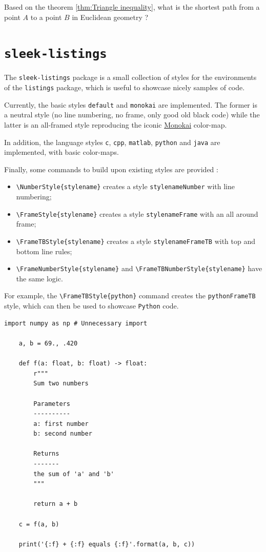 \documentclass[a4paper, 12pt]{report}
\def\tbs{\textbackslash}
\begin{document}
    \begin{fmd-question*}
        Based on the theorem \ref{thm:Triangle inequality}, what is the shortest path from a point $A$ to a point $B$ in Euclidean geometry ?
    \end{fmd-question*}

    \newpage

    \section{\texttt{sleek-listings}}

    The \texttt{sleek-listings} package is a small collection of styles for the environments of the \texttt{listings} package, which is useful to showcase nicely samples of code.

    Currently, the basic styles \texttt{default} and \texttt{monokai} are implemented. The former is a neutral style (no line numbering, no frame, only good old black code) while the latter is an all-framed style reproducing the iconic \href{https://monokai.nl/}{Monokai} color-map.

    In addition, the language styles \texttt{c}, \texttt{cpp}, \texttt{matlab}, \texttt{python} and \texttt{java} are implemented, with basic color-maps.

    Finally, some commands to build upon existing styles are provided :

    \begin{itemize}
        \item \texttt{\tbs{}NumberStyle\{stylename\}} creates a style \texttt{stylenameNumber} with line numbering;
        \item \texttt{\tbs{}FrameStyle\{stylename\}} creates a style \texttt{stylenameFrame} with an all around frame;
        \item \texttt{\tbs{}FrameTBStyle\{stylename\}} creates a style \texttt{stylenameFrameTB} with top and bottom line rules;
        \item \texttt{\tbs{}FrameNumberStyle\{stylename\}} and \texttt{\tbs{}FrameTBNumberStyle\{stylename\}} have the same logic.
    \end{itemize}

    For example, the \texttt{\tbs{}FrameTBStyle\{python\}} command creates the \texttt{pythonFrameTB} style, which can then be used to showcase \texttt{Python} code.

    \begin{lstlisting}[style=pythonFrameTB, gobble=4]
    import numpy as np # Unnecessary import

    a, b = 69., .420

    def f(a: float, b: float) -> float:
        r"""
        Sum two numbers

        Parameters
        ----------
        a: first number
        b: second number

        Returns
        -------
        the sum of 'a' and 'b'
        """

        return a + b

    c = f(a, b)

    print('{:f} + {:f} equals {:f}'.format(a, b, c))
    \end{lstlisting}
\end{document}
